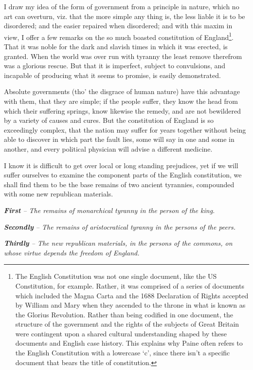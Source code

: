 \documentclass[12pt, twocolumn]{book}
\begin{document}
    I draw my idea of the form of government from a principle in nature, which no art can overturn, viz. that the more simple any thing is, the less liable it is to be disordered; and the easier repaired when disordered; and with this maxim in view, I offer a few remarks on the so much boasted constitution of England\footnote{The English Constitution was not one single document, like the US Constitution, for example. Rather, it was comprised of a series of documents which included the Magna Carta and the 1688 Declaration of Rights accepted by William and Mary when they ascended to the throne in what is known as the Glorius Revolution. Rather than being codified in one document, the structure of the government and the rights of the subjects of Great Britain were contingent upon a shared cultural understanding shaped by these documents and English case history. This explains why Paine often refers to the English Constitution with a lowercase `c', since there isn't a specific document that bears the title of constitution.}. That it was noble for the dark and slavish times in which it was erected, is granted. When the world was over run with tyranny the least remove therefrom was a glorious rescue. But that it is imperfect, subject to convulsions, and incapable of producing what it seems to promise, is easily demonstrated.

    Absolute governments (tho’ the disgrace of human nature) have this advantage with them, that they are simple; if the people suffer, they know the head from which their suffering springs, know likewise the remedy, and are not bewildered by a variety of causes and cures. But the constitution of England is so exceedingly complex, that the nation may suffer for years together without being able to discover in which part the fault lies, some will say in one and some in another, and every political physician will advise a different medicine.

    I know it is difficult to get over local or long standing prejudices, yet if we will suffer ourselves to examine the component parts of the English constitution, we shall find them to be the base remains of two ancient tyrannies, compounded with some new republican materials.

    \bigskip
    
    {\begin{adjustwidth}{0.5em}{0.5em} \small

        \centering \textit{\textbf{First} -- The remains of monarchical tyranny in the person of the king.}

        \medskip

        \textit{\textbf{Secondly} -- The remains of aristocratical tyranny in the persons of the peers.}

        \medskip

        \textit{\textbf{Thirdly} -- The new republican materials, in the persons of the commons, on whose virtue depends the freedom of England.}
    \end{adjustwidth}}
\end{document}

